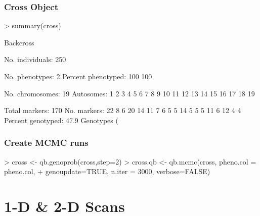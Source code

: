 \documentclass{beamer}
\begin{document}
\begin{frame}[fragile]
  \frametitle{Cross Object}

\tiny

\begin{Schunk}
\begin{Sinput}
> summary(cross)
\end{Sinput}
\begin{Soutput}
    Backcross

    No. individuals:    250 

    No. phenotypes:     2 
    Percent phenotyped: 100 100 

    No. chromosomes:    19 
        Autosomes:      1 2 3 4 5 6 7 8 9 10 11 12 13 14 15 16 17 18 19 

    Total markers:      170 
    No. markers:        22 8 6 20 14 11 7 6 5 5 14 5 5 5 11 6 12 4 4 
    Percent genotyped:  47.9 
    Genotypes (%
\end{Soutput}
\end{Schunk}

\end{frame}

\begin{frame}[fragile]
  \frametitle{Create MCMC runs}

\tiny

\begin{Schunk}
\begin{Sinput}
> cross <- qb.genoprob(cross,step=2)
> cross.qb <- qb.mcmc(cross, pheno.col = pheno.col,
+   genoupdate=TRUE, n.iter = 3000, verbose=FALSE)
\end{Sinput}
\end{Schunk}

\end{frame}

\section{1-D \& 2-D Scans}
\end{document}
